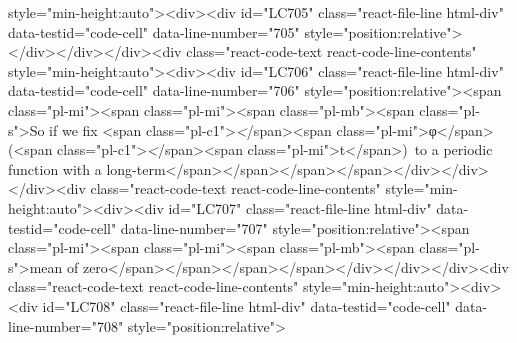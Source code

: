 {{{{{{{{style="min-height:auto"><div><div id="LC705" class="react-file-line html-div" data-testid="code-cell" data-line-number="705" style="position:relative">
</div></div></div><div class="react-code-text react-code-line-contents" style="min-height:auto"><div><div id="LC706" class="react-file-line html-div" data-testid="code-cell" data-line-number="706" style="position:relative"><span class="pl-mi"><span class="pl-mi"><span class="pl-mb"><span class="pl-s">So if we fix <span class="pl-c1">\emph</span>{<span class="pl-mi">φ</span>}(<span class="pl-c1">\emph</span>{<span class="pl-mi">t</span>})~to a periodic function with a long-term</span></span></span></span></div></div></div><div class="react-code-text react-code-line-contents" style="min-height:auto"><div><div id="LC707" class="react-file-line html-div" data-testid="code-cell" data-line-number="707" style="position:relative"><span class="pl-mi"><span class="pl-mi"><span class="pl-mb"><span class="pl-s">mean of zero</span></span></span></span></div></div></div><div class="react-code-text react-code-line-contents" style="min-height:auto"><div><div id="LC708" class="react-file-line html-div" data-testid="code-cell" data-line-number="708" style="position:relative">
}}}}}}}}
